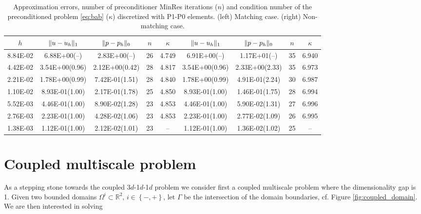 \documentclass[r]{siamart171218}
\begin{document}
\begin{table}
  \begin{center}
    \footnotesize{
  \begin{tabular}{c|cc|c|c||cc|c|c}
    \hline
    $h$ & $\lVert{u-u_h}\rVert_1$ & $\lVert{p-p_h}\rVert_0$ & $n$ & $\kappa$
        & $\lVert{u-u_h}\rVert_1$ & $\lVert{p-p_h}\rVert_0$ & $n$ & $\kappa$ \\
    \hline
8.84E-02 & 6.88E+00(--)   & 2.83E+00(--)  & 26 & 4.749  & 6.91E+00(--)   & 1.17E+01(--)  & 35 & 6.940 \\
4.42E-02 & 3.54E+00(0.96) & 2.12E+00(0.42)& 28 & 4.817  & 3.54E+00(0.96) & 2.33E+00(2.33)& 35 & 6.973 \\
2.21E-02 & 1.78E+00(0.99) & 7.42E-01(1.51)& 28 & 4.840  & 1.78E+00(0.99) & 4.91E-01(2.24)& 30 & 6.987 \\
1.10E-02 & 8.93E-01(1.00) & 2.17E-01(1.78)& 25 & 4.850  & 8.93E-01(1.00) & 1.46E-01(1.75)& 28 & 6.994 \\
5.52E-03 & 4.46E-01(1.00) & 8.90E-02(1.28)& 23 & 4.853  & 4.46E-01(1.00) & 5.90E-02(1.31)& 27 & 6.996 \\
2.76E-03 & 2.23E-01(1.00) & 4.28E-02(1.06)& 23 & 4.853  & 2.23E-01(1.00) & 2.77E-02(1.09)& 26 & 6.995 \\
1.38E-03 & 1.12E-01(1.00) & 2.12E-02(1.01)& 23 & --     & 1.12E-01(1.00) & 1.36E-02(1.02)& 25 & --    \\  
    \hline
  \end{tabular}
    }
    \caption{Approximation errors, number of preconditioner MinRes iterations ($n$) and
      condition number of the preconditioned problem \eqref{eq:bab} ($\kappa$) discretized
      with P1-P0 elements. (left) Matching case. (right) Non-matching case.}
  \label{tab:p1_p0}
  \end{center}
\end{table}

\section{Coupled multiscale problem}\label{sec:coupled} As a stepping stone
towards the coupled 3$d$-1$d$-1$d$ problem we consider first a coupled multiscale
problem where the dimensionality gap is 1. Given two bounded domains $\Omega^i \subset\mathbb{R}^2$,
$i\in\left\{-, +\right\}$, let $\Gamma$ be the intersection of the domain boundaries,
cf. Figure \ref{fig:coupled_domain}. We are then interested in solving
\end{document}
